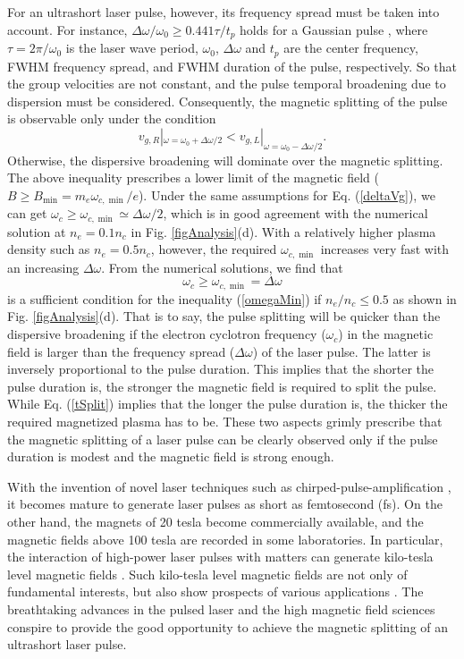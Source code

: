 \documentclass[%
aps,
preprint,
showpacs,
preprintnumbers,
 amsmath,
 amssymb,
 prl,
]{revtex4-1}
\begin{document}
For an ultrashort laser pulse, however, its frequency spread must be taken into account. For instance,
$\Delta\omega/\omega_0 \geq 0.441\tau/t_p$ holds for a Gaussian pulse \cite{Koechner}, where $\tau=2\pi/\omega_0$ is the laser wave period, $\omega_0$, $\Delta \omega$ and $t_p$ are the center frequency, FWHM frequency spread, and FWHM duration of the pulse, respectively.
So that the group velocities are not constant, and the pulse temporal broadening due to dispersion must be considered.
Consequently, the magnetic splitting of the pulse is observable only under the condition
\begin{equation}
v_{g,R}|_{\omega=\omega_0+\Delta\omega/2} < v_{g,L}|_{\omega=\omega_0-\Delta\omega/2}.  \label{omegaMin}
\end{equation}
Otherwise, the dispersive broadening will dominate over the magnetic splitting.
The above inequality prescribes a lower limit of the magnetic field ($B \ge B_{\min}=m_e\omega_{c,\min}/e$).
Under the same assumptions for Eq. (\ref{deltaVg}), we can get $\omega_c \ge \omega_{c,\min} \simeq \Delta\omega/2$, which is in good agreement with the numerical solution at $n_e=0.1n_c$ in Fig. \ref{figAnalysis}(d).
With a relatively higher plasma density such as $n_e=0.5n_c$, however, the required $\omega_{c,\min}$ increases very fast with an increasing $\Delta\omega$.
From the numerical solutions, we find that
\begin{equation}
\omega_c \ge \omega_{c,\min}=\Delta\omega
\end{equation}
is a sufficient condition for the inequality (\ref{omegaMin}) if $n_e/n_c \le 0.5$ as shown in Fig. \ref{figAnalysis}(d).
That is to say, the pulse splitting will be quicker than the dispersive broadening if the electron cyclotron frequency ($\omega_c$) in the magnetic field is larger than the frequency spread ($\Delta \omega$) of the laser pulse. The latter is inversely proportional to the pulse duration.
This implies that the shorter the pulse duration is, the stronger the magnetic field is required to split the pulse.
While Eq. (\ref{tSplit}) implies that the longer the pulse duration is, the thicker the required magnetized plasma has to be.
These two aspects grimly prescribe that the magnetic splitting of a laser pulse can be clearly observed only if the pulse duration is modest and the magnetic field is strong enough.

With the invention of novel laser techniques such as chirped-pulse-amplification \cite{Strickland}, it becomes mature to generate laser pulses as short as femtosecond (fs). On the other hand, the magnets of 20 tesla become commercially available, and the magnetic fields above 100 tesla are recorded in some laboratories\cite{Report}. In particular, the interaction of high-power laser pulses with matters can generate kilo-tesla level magnetic fields \cite{Fujioka,Wagner}. Such kilo-tesla level magnetic fields are not only of fundamental interests, but also show prospects of various applications \cite{Eliezer,HoraLPB,Miley}. The breathtaking advances in the pulsed laser and the high magnetic field sciences conspire to provide the good opportunity to achieve the magnetic splitting of an ultrashort laser pulse.
\end{document}
